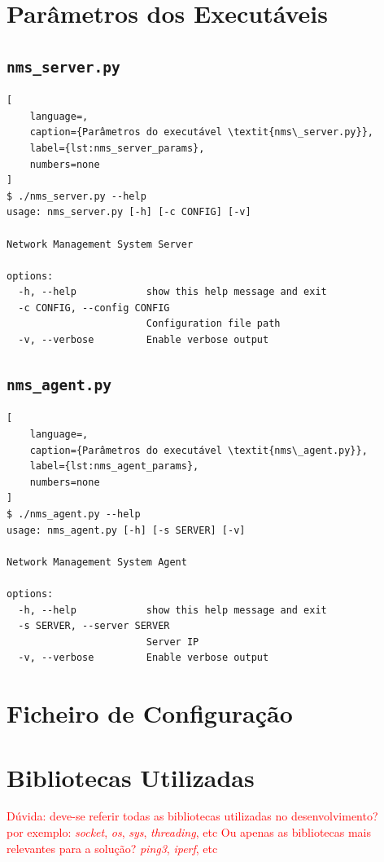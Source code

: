 \documentclass[a4paper,12pt]{scrreprt}
\begin{document}
\section{Parâmetros dos Executáveis}

\subsection{\texttt{nms\_server.py}}

\begin{lstlisting}[
    language=,
    caption={Parâmetros do executável \textit{nms\_server.py}},
    label={lst:nms_server_params},
    numbers=none
]
$ ./nms_server.py --help
usage: nms_server.py [-h] [-c CONFIG] [-v]

Network Management System Server

options:
  -h, --help            show this help message and exit
  -c CONFIG, --config CONFIG
                        Configuration file path
  -v, --verbose         Enable verbose output
\end{lstlisting}

\subsection{\texttt{nms\_agent.py}}

\begin{lstlisting}[
    language=,
    caption={Parâmetros do executável \textit{nms\_agent.py}},
    label={lst:nms_agent_params},
    numbers=none
]
$ ./nms_agent.py --help
usage: nms_agent.py [-h] [-s SERVER] [-v]

Network Management System Agent

options:
  -h, --help            show this help message and exit
  -s SERVER, --server SERVER
                        Server IP
  -v, --verbose         Enable verbose output
\end{lstlisting}

\section{Ficheiro de Configuração}

\section{Bibliotecas Utilizadas}

\textcolor{red}{
    Dúvida: deve-se referir todas as bibliotecas utilizadas no desenvolvimento? \\
    por exemplo: \textit{socket}, \textit{os}, \textit{sys}, \textit{threading}, etc
    Ou apenas as bibliotecas mais relevantes para a solução? \textit{ping3}, \textit{iperf}, etc
}
\end{document}
